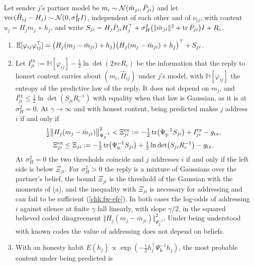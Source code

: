 \begin{proposition}\label{prop:fw-bounded-confidence}
Let sender $j$'s partner model be $m_i\sim\mathcal{N}(\bar m_{ji},\bar P_{ji})$ and let $\mathrm{vec}(\hat H_{ij}-H_j)\sim\mathcal{N}(0,\sigma_H^2I)$, independent of each other and of $\nu_{ij}$, with content $u_j=H_jm_j+h_j$, and write $S_{ji}=H_j\bar P_{ji}H_j^\top+\sigma_H^2\bigl(\Vert\bar m_{ji}\Vert^2+\operatorname{tr}\bar P_{ji}\bigr)I+R_c$.
\begin{enumerate}
\item[(a)] $\mathbb{E}[\varphi_{ij}\varphi_{ij}^\top]=\bigl(H_j(m_j-\bar m_{ji})+h_j\bigr)\bigl(H_j(m_j-\bar m_{ji})+h_j\bigr)^\top+S_{ji}$.
\item[(b)] Let $I^{\mathrm{tx}}_{ji}:=\mathbb H[\varphi_{ij}]-\tfrac12\ln\det(2\pi eR_c)$ be the information that the reply to honest content carries about $(m_i,\hat H_{ij})$ under $j$'s model, with $\mathbb H[\varphi_{ij}]$ the entropy of the predictive law of the reply. It does not depend on $m_j$, and $I^{\mathrm{tx}}_{ji}\le\tfrac12\ln\det(S_{ji}R_c^{-1})$ with equality when that law is Gaussian, as it is at $\sigma_H^2=0$. At $\gamma\to\infty$ and with honest content, being predicted makes $j$ address $i$ if and only if
\begin{gather*}
\tfrac12\bigl\Vert H_j(m_j-\bar m_{ji})\bigr\Vert^2_{\Psi_{\mathrm p}^{-1}}<\Xi^{\mathrm{ex}}_{ji}:=-\tfrac12\operatorname{tr}\bigl(\Psi_{\mathrm p}^{-1}S_{ji}\bigr)+I^{\mathrm{tx}}_{ji}-g_{\mathrm{tx}},\\
\Xi^{\mathrm{ex}}_{ji}\le\Xi_{ji}:=-\tfrac12\operatorname{tr}\bigl(\Psi_{\mathrm p}^{-1}S_{ji}\bigr)+\tfrac12\ln\det\bigl(S_{ji}R_c^{-1}\bigr)-g_{\mathrm{tx}}.
\end{gather*}
At $\sigma_H^2=0$ the two thresholds coincide and $j$ addresses $i$ if and only if the left side is below $\Xi_{ji}$. For $\sigma_H^2>0$ the reply is a mixture of Gaussians over the partner's belief, the bound $\Xi_{ji}$ is the threshold of the Gaussian with the moments of (a), and the inequality with $\Xi_{ji}$ is necessary for addressing and can fail to be sufficient (\cref{chk:fw-efe}). In both cases the log-odds of addressing $i$ against silence at finite $\gamma$ fall linearly, with slope $\gamma/2$, in the squared believed coded disagreement $\Vert H_j(m_j-\bar m_{ji})\Vert^2_{\Psi_{\mathrm p}^{-1}}$. Under being understood with known codes the value of addressing does not depend on beliefs.
\item[(c)] With an honesty habit $E(h_j)\propto\exp(-\tfrac12h_j^\top\Psi_{\mathrm h}^{-1}h_j)$, the most probable content under being predicted is

\end{enumerate}
\end{proposition}
